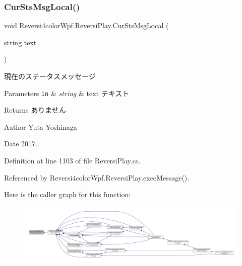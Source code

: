 \subsubsection{\texorpdfstring{Cur\+Sts\+Msg\+Local()}{CurStsMsgLocal()}}
{\footnotesize\ttfamily void Reversi4color\+Wpf.\+Reversi\+Play.\+Cur\+Sts\+Msg\+Local (\begin{DoxyParamCaption}\item[{string}]{text }\end{DoxyParamCaption})\hspace{0.3cm}{\ttfamily [private]}}



現在のステータスメッセージ 


\begin{DoxyParams}[1]{Parameters}
\mbox{\tt in}  & {\em string} & text テキスト \\
\hline
\end{DoxyParams}
\begin{DoxyReturn}{Returns}
ありません 
\end{DoxyReturn}
\begin{DoxyAuthor}{Author}
Yuta Yoshinaga 
\end{DoxyAuthor}
\begin{DoxyDate}{Date}
2017.. 
\end{DoxyDate}


Definition at line 1103 of file Reversi\+Play.\+cs.



Referenced by Reversi4color\+Wpf.\+Reversi\+Play.\+exec\+Message().

Here is the caller graph for this function\+:
\nopagebreak
\begin{figure}[H]
\begin{center}
\leavevmode
\includegraphics[width=350pt]{class_reversi4color_wpf_1_1_reversi_play_ac370dc8e96852754f9c4846a3d2a49c6_icgraph}
\end{center}
\end{figure}
\mbox{\label{class_reversi4color_wpf_1_1_reversi_play_a12e412e027b1e55abf3d767626a6f1d9}} 
